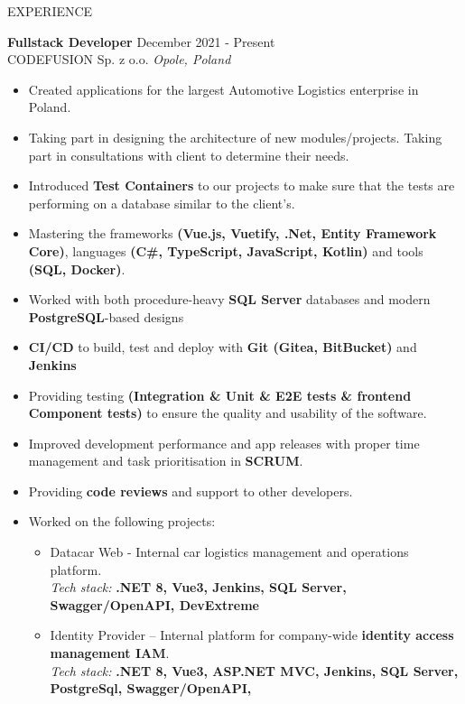 \documentclass{resume}
\begin{document}
\begin{rSection}{EXPERIENCE}

\textbf{Fullstack Developer} \hfill December 2021 - Present \\ [0.4em]
CODEFUSION Sp. z o.o. \hfill \textit{Opole, Poland}
\begin{itemize}[leftmargin=0.5cm]
\itemsep-3pt {}
    \item Created applications for the largest Automotive Logistics enterprise in Poland.
    \item Taking part in designing the architecture of new modules/projects. Taking part in consultations with client to determine their needs.
    \item Introduced  \textbf{Test Containers} to our projects to make sure that the tests are performing on a database similar to the client's.
    \item Mastering the frameworks \textbf{(Vue.js, Vuetify, .Net, Entity Framework Core)}, languages \textbf{(C\#, TypeScript, JavaScript, Kotlin)} and tools \textbf{(SQL, Docker)}.
    \item Worked with both procedure-heavy \textbf{SQL Server} databases and modern \textbf{PostgreSQL}-based designs
    \item \textbf{CI/CD} to build, test and deploy with \textbf{Git (Gitea, BitBucket)} and \textbf{Jenkins}
    \item Providing testing \textbf{(Integration \& Unit \& E2E tests \& frontend Component tests)} to ensure the quality and usability of the software.
    \item Improved development performance and app releases with proper time management and task prioritisation in \textbf{SCRUM}.
    \item Providing \textbf{code reviews} and support to other developers.
    \item Worked on the following projects:
    \begin{itemize}
        \item Datacar Web - Internal car logistics management and operations platform. \\ [0.4em]
        \textit{Tech stack:} \textbf{.NET 8, Vue3, Jenkins, SQL Server, Swagger/OpenAPI, DevExtreme}
        \item Identity Provider – Internal platform for company-wide \textbf{identity access management IAM}. \\ [0.4em]
        \textit{Tech stack:} \textbf{.NET 8, Vue3, ASP.NET MVC, Jenkins, SQL Server, PostgreSql, Swagger/OpenAPI,
}
\end{itemize}
\end{itemize}
\end{rSection}
\end{document}
